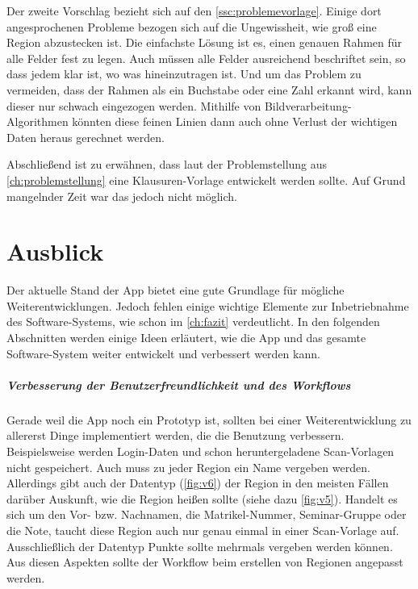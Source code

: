 \documentclass[notables, nomenclature, oneside, 150]{HSMW-Thesis}
\begin{document}
		Der zweite Vorschlag bezieht sich auf den \autoref{ssc:problemevorlage}. Einige dort angesprochenen Probleme bezogen sich auf die Ungewissheit, wie groß eine Region abzustecken ist. Die einfachste Lösung ist es, einen genauen Rahmen für alle Felder fest zu legen. Auch müssen alle Felder ausreichend beschriftet sein, so dass jedem klar ist, wo was hineinzutragen ist. Und um das Problem zu vermeiden, dass der Rahmen als ein Buchstabe oder eine Zahl erkannt wird, kann dieser nur schwach eingezogen werden. Mithilfe von Bildverarbeitung-Algorithmen könnten diese feinen Linien dann auch ohne Verlust der wichtigen Daten heraus gerechnet werden. 
		
		Abschließend ist zu erwähnen, dass laut der Problemstellung aus \autoref{ch:problemstellung} eine Klausuren-Vorlage entwickelt werden sollte. Auf Grund mangelnder Zeit war das jedoch nicht möglich. 


		
\chapter{Ausblick}\label{ch:ausblick}
	Der aktuelle Stand der App bietet eine gute Grundlage für mögliche Weiterentwicklungen. Jedoch fehlen einige wichtige Elemente zur Inbetriebnahme des Software-Systems, wie schon im \autoref{ch:fazit} verdeutlicht. In den folgenden Abschnitten werden einige Ideen erläutert, wie die App und das gesamte Software-System weiter entwickelt und verbessert werden kann.

	\paragraph*{Verbesserung der Benutzerfreundlichkeit und des Workflows} \label{pa:benutzer} 
		Gerade weil die App noch ein Prototyp ist, sollten bei einer Weiterentwicklung zu allererst Dinge implementiert werden, die die Benutzung verbessern. Beispielsweise werden Login-Daten und schon heruntergeladene Scan-Vorlagen nicht gespeichert. Auch muss zu jeder Region ein Name vergeben werden. Allerdings gibt auch der Datentyp (\ref{fig:v6}) der Region in den meisten Fällen darüber Auskunft, wie die Region heißen sollte (siehe dazu \autoref{fig:v5}). Handelt es sich um den Vor- bzw. Nachnamen, die Matrikel-Nummer, Seminar-Gruppe oder die Note, taucht diese Region auch nur genau einmal in einer Scan-Vorlage auf. Ausschließlich der Datentyp Punkte sollte mehrmals vergeben werden können. Aus diesen Aspekten sollte der Workflow beim erstellen von Regionen angepasst werden. 
	
\end{document}
